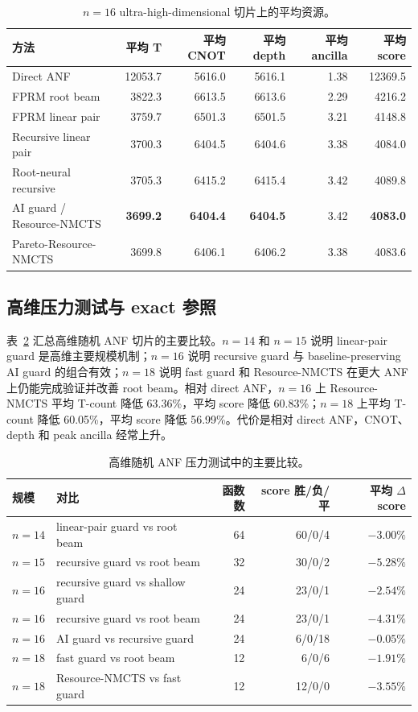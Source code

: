 \documentclass[UTF8,fontset=macnew,11pt]{ctexart}
\newcommand{\method}{Resource-NMCTS}
\newcommand{\pareto}{Pareto-Resource-NMCTS}
\begin{document}
\begin{table}[t]
\centering
\small
\caption{$n=16$ ultra-high-dimensional 切片上的平均资源。}
\label{tab:n16}
\begin{tabular}{lrrrrr}
\toprule
方法 & 平均 T & 平均 CNOT & 平均 depth & 平均 ancilla & 平均 score \\
\midrule
Direct ANF & 12053.7 & 5616.0 & 5616.1 & 1.38 & 12369.5 \\
FPRM root beam & 3822.3 & 6613.5 & 6613.6 & 2.29 & 4216.2 \\
FPRM linear pair & 3759.7 & 6501.3 & 6501.5 & 3.21 & 4148.8 \\
Recursive linear pair & 3700.3 & 6404.5 & 6404.6 & 3.38 & 4084.0 \\
Root-neural recursive & 3705.3 & 6415.2 & 6415.4 & 3.42 & 4089.8 \\
AI guard / \method{} & \textbf{3699.2} & \textbf{6404.4} & \textbf{6404.5} & 3.42 & \textbf{4083.0} \\
\pareto{} & 3699.8 & 6406.1 & 6406.2 & 3.38 & 4083.6 \\
\bottomrule
\end{tabular}
\end{table}

\subsection{高维压力测试与 exact 参照}

表~\ref{tab:highdim} 汇总高维随机 ANF 切片的主要比较。$n=14$ 和 $n=15$ 说明 linear-pair guard 是高维主要规模机制；$n=16$ 说明 recursive guard 与 baseline-preserving AI guard 的组合有效；$n=18$ 说明 fast guard 和 \method{} 在更大 ANF 上仍能完成验证并改善 root beam。相对 direct ANF，$n=16$ 上 \method{} 平均 T-count 降低 63.36\%，平均 score 降低 60.83\%；$n=18$ 上平均 T-count 降低 60.05\%，平均 score 降低 56.99\%。代价是相对 direct ANF，CNOT、depth 和 peak ancilla 经常上升。

\begin{table}[t]
\centering
\small
\caption{高维随机 ANF 压力测试中的主要比较。}
\label{tab:highdim}
\begin{tabularx}{\linewidth}{llrrr}
\toprule
规模 & 对比 & 函数数 & score 胜/负/平 & 平均 $\Delta$ score \\
\midrule
$n=14$ & linear-pair guard vs root beam & 64 & 60/0/4 & $-3.00\%$ \\
$n=15$ & recursive guard vs root beam & 32 & 30/0/2 & $-5.28\%$ \\
$n=16$ & recursive guard vs shallow guard & 24 & 23/0/1 & $-2.54\%$ \\
$n=16$ & recursive guard vs root beam & 24 & 23/0/1 & $-4.31\%$ \\
$n=16$ & AI guard vs recursive guard & 24 & 6/0/18 & $-0.05\%$ \\
$n=18$ & fast guard vs root beam & 12 & 6/0/6 & $-1.91\%$ \\
$n=18$ & \method{} vs fast guard & 12 & 12/0/0 & $-3.55\%$ \\
\bottomrule
\end{tabularx}
\end{table}
\end{document}
